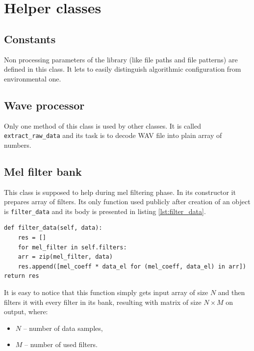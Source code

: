 \documentclass[magister]{dyplom}
\begin{document}
	\section{Helper classes}
	
	\subsection{Constants}
	
	Non processing parameters of the library (like file paths and file patterns) are defined in this class. It lets to easily distinguish algorithmic configuration from environmental one.
	
	\subsection{Wave processor}
	
	Only one method of this class is used by other classes. It is called \texttt{extract\_raw\_data} and its task is to decode \gls{WAV} file into plain array of numbers.
	
	\subsection{Mel filter bank}
	
	This class is supposed to help during mel filtering phase. In its constructor it prepares array of filters. Its only function used publicly after creation of an object is \texttt{filter\_data} and its body is presented in listing \ref{lst:filter_data}.\\
	
	\begingroup
	\begin{verbatim}	
def filter_data(self, data):
    res = []	
    for mel_filter in self.filters:
    arr = zip(mel_filter, data)
    res.append([mel_coeff * data_el for (mel_coeff, data_el) in arr])	
return res	
	\end{verbatim}
	\endgroup
	\vspace{1em}
	
	It is easy to notice that this function simply gets input array of size $N$ and then filters it with every filter in its bank, resulting with matrix of size $N \times M$ on output, where:
	
	\begin{itemize}
		\item $N$ -- number of data samples,
		\item $M$ -- number of used filters.
	\end{itemize}
	
\end{document}
